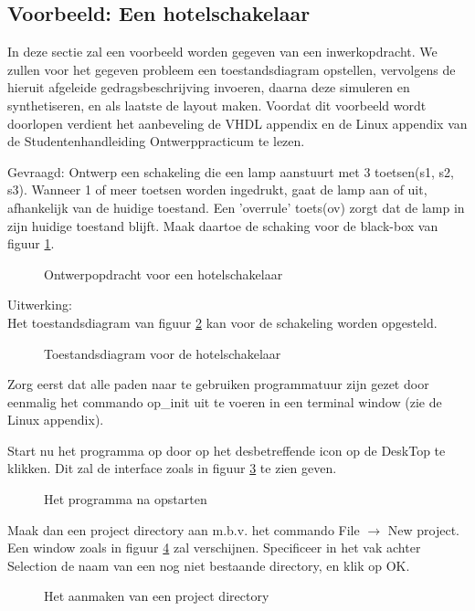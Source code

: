 \subsection{Voorbeeld: Een hotelschakelaar}
\label{voorbeeld}
In deze sectie zal een voorbeeld worden gegeven van een inwerkopdracht.
We zullen voor het gegeven probleem een toestandsdiagram opstellen,
vervolgens de hieruit afgeleide  gedragsbeschrijving invoeren,
daarna deze simuleren en synthetiseren, en als laatste de layout maken.
Voordat dit voorbeeld wordt doorlopen verdient het aanbeveling
de VHDL appendix en de Linux appendix
van de Studentenhandleiding Ontwerppracticum te lezen.

Gevraagd: Ontwerp een schakeling die een lamp aanstuurt met 3 toetsen(s1, s2, s3).
Wanneer 1 of meer toetsen worden ingedrukt, gaat de lamp aan of uit, afhankelijk
van de huidige toestand. Een 'overrule' toets(ov) zorgt dat de lamp in zijn
huidige toestand blijft.
Maak daartoe de schaking voor de black-box van figuur \ref{hotel-opdr}.\\
\begin{figure}[bth]
\centerline{}
\caption{Ontwerpopdracht voor een hotelschakelaar}
\label{hotel-opdr}
\end{figure}

Uitwerking:\\
Het toestandsdiagram van figuur \ref{hotel-toest} kan voor de schakeling
worden opgesteld.\\

\begin{figure}[h]
\centerline{}
\caption{Toestandsdiagram voor de hotelschakelaar}
\label{hotel-toest}
\end{figure}

Zorg eerst dat alle paden naar te gebruiken programmatuur zijn gezet
door eenmalig het commando op\_init uit te voeren in een terminal window
(zie de Linux appendix).

Start nu het programma  op door op het desbetreffende
icon op de DeskTop te klikken.
Dit zal de interface zoals in figuur \ref{designflow} te zien geven.
\begin{figure}[h]
\centerline{}
\caption{Het programma  na opstarten}
\label{designflow}
\end{figure}
\FloatBarrier

Maak dan een project directory aan m.b.v. het commando File $\rightarrow$ New project.
Een window zoals in figuur \ref{newproj} zal verschijnen.
Specificeer in het vak achter Selection de naam van een nog niet
bestaande directory, en klik op OK.
\begin{figure}[h]
\centerline{}
\caption{Het aanmaken van een project directory}
\label{newproj}
\end{figure}

